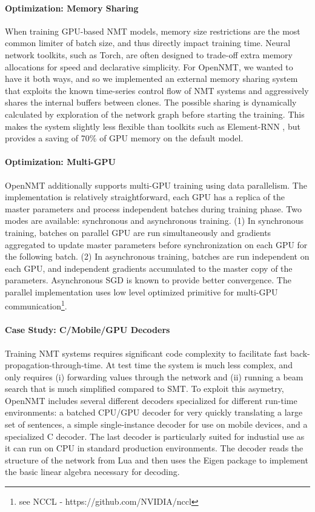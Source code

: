 \documentclass[11pt]{article}
\begin{document}
\paragraph{Optimization: Memory Sharing}

When training GPU-based NMT models, memory size restrictions are the
most common limiter of batch size, and thus directly impact training
time. Neural network toolkits, such as Torch, are often designed to
trade-off extra memory allocations for speed and declarative
simplicity. For OpenNMT, we wanted to have it both ways, and so we
implemented an external memory sharing system that exploits the known
time-series control flow of NMT systems and aggressively shares the
internal buffers between clones. The possible sharing is dynamically
calculated by exploration of the network graph before starting the
training.  This makes the system slightly less flexible than toolkits
such as Element-RNN \cite{DBLP:journals/corr/LeonardWW15ss}, but
provides a saving of 70\% of GPU memory on the default model. 

\paragraph{Optimization: Multi-GPU} OpenNMT additionally supports multi-GPU
training using data parallelism. The implementation is relatively straightforward, each GPU
 has a replica of the master parameters and process independent batches during training phase.
Two modes are available: synchronous and asynchronous training.
(1) In synchronous training, batches on parallel GPU are run simultaneously and gradients 
aggregated to update master parameters before synchronization on each GPU for the following batch.
(2) In asynchronous training, batches are run independent on each GPU, and independent gradients accumulated 
to the master copy of the parameters. Asynchronous SGD is known to provide better convergence.
The parallel implementation uses low level optimized primitive for multi-GPU communication\footnote{see NCCL - https://github.com/NVIDIA/nccl}.

\paragraph{Case Study: C/Mobile/GPU Decoders} Training NMT
systems requires significant code complexity to facilitate fast
back-propagation-through-time. At test time the
system is much less complex, and only requires (i) forwarding values
through the network and (ii) running a beam search that is much
simplified compared to SMT. To exploit this asymetry, OpenNMT includes
several different decoders specialized for different run-time
environments: a batched CPU/GPU decoder for very quickly translating a
large set of sentences, a simple single-instance decoder for use on
mobile devices, and a specialized C decoder. The last decoder is
particularly suited for industial use as it can run on CPU in standard
production environments. The decoder reads the structure of the
network from Lua and then uses the Eigen package to implement the
basic linear algebra necessary for decoding. 
\end{document}

